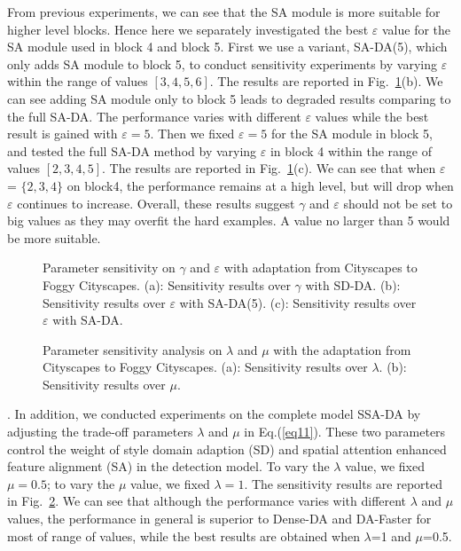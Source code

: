 \documentclass[runningheads]{llncs}
\begin{document}
From previous experiments, we can see that the SA module is more suitable for higher level blocks.
Hence here we separately investigated the best $\varepsilon$ value for the SA module used in block 4 and block 5.
First we use a variant, SA-DA(5), which only adds SA module to block 5, to conduct sensitivity experiments
by varying $\varepsilon$ within the range of values $[3, 4, 5, 6]$.
The results are reported in Fig.~\ref{fig:three}(b).
We can see adding SA module only to block 5 leads to degraded results comparing to the full SA-DA.
The performance varies with different $\varepsilon$ values while the best result is gained with $\varepsilon=5$.
Then we fixed $\varepsilon=5$ for the SA module in block 5, 
and tested the full SA-DA method 
by varying $\varepsilon$ in block 4 within the range of values $[2, 3, 4, 5]$.
The results are reported in Fig.~\ref{fig:three}(c). 
We can see that when $\varepsilon$ = $\{2,3,4\}$ on block4, 
the performance remains at a high level, but will drop when $\varepsilon$ continues to increase.
Overall, these results suggest $\gamma$ and $\varepsilon$ should not be set to big values
as they may overfit the hard examples. A value no larger than 5 would be more suitable.
\\


\begin{figure}[t]
\centering
{}
\quad
{}
\quad
{}
\caption{Parameter sensitivity on $\gamma$ and $\varepsilon$ with adaptation from Cityscapes to Foggy Cityscapes. 
{(a)}: Sensitivity results over $\gamma$ with SD-DA. 
{(b)}: Sensitivity results over $\varepsilon$ with SA-DA(5).
{(c)}: Sensitivity results over $\varepsilon$ with SA-DA.}
\label{fig:three}
\end{figure}
\begin{figure}[t]
\centering
{}
\quad
{}
   \caption{Parameter sensitivity analysis on $\lambda$ and $\mu$ with the adaptation from Cityscapes to Foggy Cityscapes. 
	{(a)}: Sensitivity results over $\lambda$. {(b)}: Sensitivity results over $\mu$.}
\label{fig:four}
\end{figure}
. 
In addition, we conducted experiments on the complete model SSA-DA by adjusting the trade-off parameters $\lambda$ and $\mu$ in Eq.(\ref{eq11}). 
These two parameters control the weight of style domain adaption (SD) and spatial attention enhanced feature alignment (SA) 
in the detection model. 
To vary the $\lambda$ value, we fixed $\mu=0.5$; to vary the $\mu$ value, we fixed $\lambda=1$.
The sensitivity results are reported in Fig.~\ref{fig:four}.
We can see that although the performance varies with different $\lambda$ and $\mu$ values,
the performance in general is superior to Dense-DA and DA-Faster for most of range of values,
while the best results are obtained when $\lambda$=1 and $\mu$=0.5.
\end{document}
